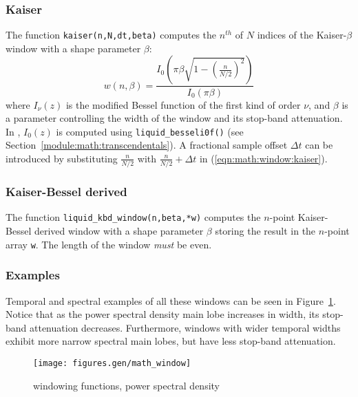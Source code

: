 \subsubsection{Kaiser}
\label{module:math:window:kaiser}
The function {\tt kaiser(n,N,dt,beta)} computes the $n^{th}$ of $N$
indices of the Kaiser-$\beta$ window with a shape parameter $\beta$:
%
\begin{equation}
\label{eqn:math:window:kaiser}
    w(n,\beta) = \frac{
        I_0\left(\pi\beta\sqrt{1-\left(\frac{n}{N/2}\right)^2}\right)
    }{
        I_0\left(\pi\beta\right)
    }
\end{equation}
%
where $I_\nu(z)$ is the modified Bessel function of the first kind of
order $\nu$, and $\beta$ is a parameter controlling the width of the
window and its stop-band attenuation.
In \liquid, $I_0(z)$ is computed using {\tt liquid\_besseli0f()}
(see Section~\ref{module:math:transcendentals}).
A fractional sample offset $\Delta t$ can be introduced by substituting
$\frac{n}{N/2}$ with
$\frac{n}{N/2} + \Delta t$ in (\ref{eqn:math:window:kaiser}).

\subsubsection{Kaiser-Bessel derived}
\label{module:math:window:kbd}
The function {\tt liquid\_kbd\_window(n,beta,*w)}
computes the $n$-point Kaiser-Bessel derived window with a shape
parameter $\beta$ storing the result in the $n$-point array {\tt w}.
The length of the window {\em must} be even.


\subsubsection{Examples}
\label{module:math:window:examples}
Temporal and spectral examples of all these windows can be seen in
Figure~\ref{fig:module:math:window}.
Notice that as the power spectral density main lobe increases in width, its
stop-band attenuation decreases.
Furthermore, windows with wider temporal widths exhibit more narrow spectral
main lobes, but have less stop-band attenuation.

\begin{figure}
\centering
  \texttt{[image: figures.gen/math\_window]}
\caption{windowing functions, power spectral density}
\label{fig:module:math:window}
\end{figure}



